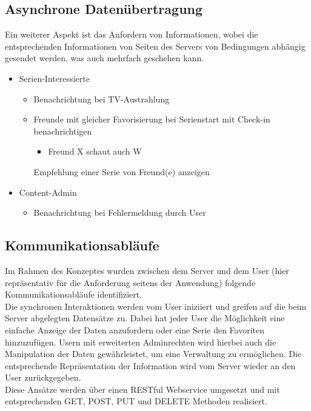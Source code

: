 \subsection{Asynchrone Datenübertragung}

Ein weiterer Aspekt ist das Anfordern von Informationen, wobei die entsprechenden Informationen von Seiten des Servers von Bedingungen abhängig gesendet werden, was auch mehrfach geschehen kann.

\begin{itemize}
\item
Serien-Interessierte
  \begin{itemize}
  \item
    Benachrichtung bei TV-Austrahlung
    \item
    Freunde mit gleicher Favorisierung bei Serienstart mit Check-in benachrichtigen
      \begin{itemize}
      \item
         Freund X schaut auch W
         \end{itemize}
    Empfehlung einer Serie von Freund(e) anzeigen
    \end{itemize}
\item
Content-Admin
  \begin{itemize}
  \item
    Benachrichtung bei Fehlermeldung durch User
    \end{itemize}
\end{itemize}

\subsection{Kommunikationsabläufe}
Im Rahmen des Konzeptes wurden zwischen dem Server und dem User (hier repräsentativ für die Anforderung seitens der Anwendung) folgende Kommunikationsabläufe identifiziert.\\
Die synchronen Interaktionen werden vom User iniziiert und greifen auf die beim Server abgelegten Datensätze zu. Dabei hat jeder User die Möglichkeit eine einfache Anzeige der Daten anzufordern oder eine Serie den Favoriten hinzuzufügen. Usern mit erweiterten Adminrechten wird hierbei auch die Manipulation der Daten gewährleistet, um eine Verwaltung zu ermöglichen. Die entsprechende Repräsentation der Information wird vom Server wieder an den User zurückgegeben.\\
Diese Ansätze werden über einen RESTful Webservice umgesetzt und mit entsprechenden GET, POST, PUT und DELETE Methoden realisiert.


